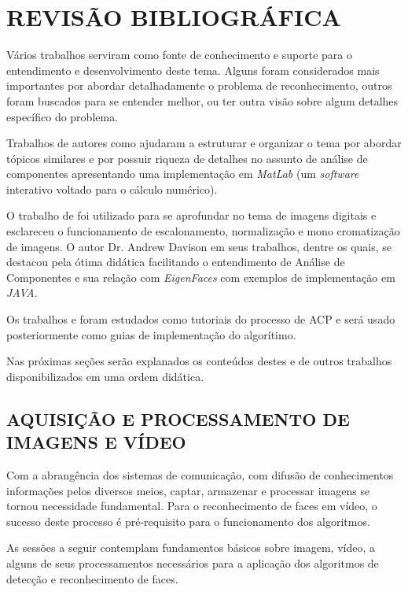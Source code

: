 
\chapter{REVISÃO BIBLIOGRÁFICA}\label{ch:rev-bibs}

Vários trabalhos serviram como fonte de conhecimento e suporte para o entendimento e desenvolvimento deste tema. Alguns foram considerados mais importantes por abordar detalhadamente o problema de reconhecimento, outros foram buscados para se entender melhor, ou ter outra visão sobre algum detalhes específico do problema.

Trabalhos de autores como \cite{geysilva} ajudaram a estruturar e organizar o tema por abordar tópicos similares e por possuir riqueza de detalhes no assunto de análise de componentes apresentando uma implementação em \textit{MatLab} (um \textit{software} interativo voltado para o cálculo numérico).

O trabalho de \cite{img-digital-willians} foi utilizado para se aprofundar no tema de imagens digitais e \cite{bibid} esclareceu o funcionamento de escalonamento, normalização e mono cromatização de imagens. O autor Dr. Andrew Davison em seus trabalhos, dentre os quais, \cite{drmathew_java_programming} se destacou pela ótima didática facilitando o entendimento de Análise de Componentes e sua relação com \textit{EigenFaces} com exemplos de implementação em \textit{JAVA}. 

Os trabalhos \cite{tutorial_en_smith} e \cite{tutorial_pt} foram estudados como tutoriais do processo de ACP e será usado posteriormente como guias de implementação do algorítimo.

Nas próximas seções serão explanados os conteúdos destes e de outros trabalhos disponibilizados em uma ordem didática.


\section{AQUISIÇÃO E PROCESSAMENTO DE IMAGENS E VÍDEO}\label{sec:processamento_imagens}

Com a abrangência dos sistemas de comunicação, com difusão de conhecimentos informações pelos diversos meios, captar, armazenar e processar imagens se tornou necessidade fundamental. Para o reconhecimento de faces em vídeo, o sucesso deste processo é pré-requisito  para o funcionamento dos algoritmos. 

As sessões a seguir contemplam fundamentos básicos sobre imagem, vídeo, a alguns de seus processamentos necessários para a aplicação dos algoritmos de detecção e reconhecimento de faces.


